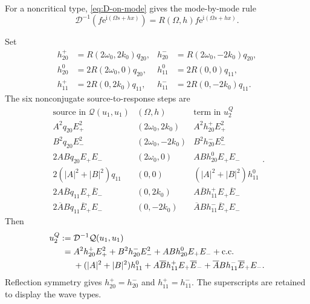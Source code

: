 \documentclass[11pt]{article}
\newcommand{\ii}{\mathrm{i}}
\newcommand{\ee}{\mathrm{e}}
\newcommand{\cQ}{\mathcal{Q}}
\newcommand{\cD}{\mathcal{D}}
\newcommand{\cc}{\mathrm{c.c.}}
\begin{document}
For a noncritical type, \eqref{eq:D-on-mode} gives the mode-by-mode rule
\begin{equation}
 \cD^{-1}\left(f\ee^{\ii(\Omega s+hx)}\right)
 =R(\Omega,h)f\ee^{\ii(\Omega s+hx)}.
 \label{eq:D-inverse-rule}
\end{equation}

Set
\begin{subequations}
\label{eq:h-vectors}
\begin{align}
 h_{20}^+&=R(2\omega_0,2k_0)q_{20},
 &h_{20}^-&=R(2\omega_0,-2k_0)q_{20},\\
 h_{20}^0&=2R(2\omega_0,0)q_{20},
 &h_{11}^0&=2R(0,0)q_{11},\\
 h_{11}^+&=2R(0,2k_0)q_{11},
 &h_{11}^-&=2R(0,-2k_0)q_{11}.
\end{align}
\end{subequations}
The six nonconjugate source-to-response steps are
\begin{equation}
\begin{array}{c|c|c}
 \text{source in }\cQ(u_1,u_1)&(\Omega,h)&\text{term in }u_2^Q\\ \hline
 A^2q_{20}E_+^2&(2\omega_0,2k_0)&A^2h_{20}^+E_+^2\\
 B^2q_{20}E_-^2&(2\omega_0,-2k_0)&B^2h_{20}^-E_-^2\\
 2ABq_{20}E_+E_-&(2\omega_0,0)&ABh_{20}^0E_+E_-\\
 2(|A|^2+|B|^2)q_{11}&(0,0)&(|A|^2+|B|^2)h_{11}^0\\
 2A\overline Bq_{11}E_+\overline E_-&(0,2k_0)
 &A\overline Bh_{11}^+E_+\overline E_-\\
 2\overline ABq_{11}\overline E_+E_-&(0,-2k_0)
 &\overline ABh_{11}^-\overline E_+E_-
\end{array}.
 \label{eq:u2-source-response-table}
\end{equation}
Then
\begin{align}
 u_2^{Q}:={}&\cD^{-1}\cQ(u_1,u_1)\notag\\
 ={}&A^2h_{20}^+E_+^2+B^2h_{20}^-E_-^2
 +ABh_{20}^0E_+E_-+\cc\notag\\
 &+(|A|^2+|B|^2)h_{11}^0
 +A\overline B h_{11}^+E_+\overline E_-
 +\overline A B h_{11}^-\overline E_+E_-.
 \label{eq:u2Q}
\end{align}
Reflection symmetry gives $h_{20}^+=h_{20}^-$ and
$h_{11}^+=h_{11}^-$.  The superscripts are retained to display the wave
types.
\end{document}
